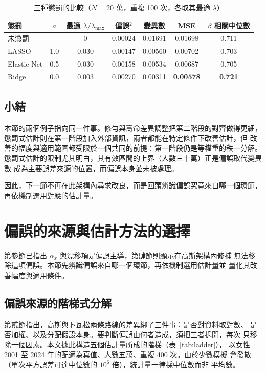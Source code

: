 \documentclass[UTF8, fontset=macnew, a4paper, 12pt]{ctexart}
\begin{document}
\begin{table}[H]
\centering
\caption{三種懲罰的比較（$N=20$ 萬，重複 100 次，各取其最適 $\lambda$）}
\small
\begin{tabular}{lcccccc}
\toprule
懲罰 & $a$ & 最適 $\lambda/\lambda_{\max}$ & 偏誤$^2$ & 變異數 & MSE & $\beta$ 相關中位數\\
\midrule
未懲罰 & --- & 0 & 0.00024 & 0.01691 & 0.01698 & 0.711\\
LASSO & 1.0 & 0.030 & 0.00147 & 0.00560 & 0.00702 & 0.703\\
Elastic Net & 0.5 & 0.030 & 0.00158 & 0.00534 & 0.00687 & 0.705\\
Ridge & 0.0 & 0.003 & 0.00270 & 0.00311 & \textbf{0.00578} & \textbf{0.721}\\
\bottomrule
\end{tabular}
\label{tab:pen}
\end{table}

\subsection{小結}

本節的兩個例子指向同一件事。修勻與壽命差異調整把第二階段的對齊做得更細，
懲罰式估計則在第一階段加入外部資訊，兩者都能在特定條件下改善估計，但
改善的幅度與適用範圍都受限於一個共同的前提：第一階段仍是等權重的秩一分解。
懲罰式估計的限制尤其明白，其有效區間的上界（人數三十萬）正是偏誤取代變異數
成為主要誤差來源的位置，而偏誤本身並未被處理。

因此，下一節不再在此架構內尋求改良，而是回頭辨識偏誤究竟來自哪一個環節，
再依機制選用對應的估計量。

\section{偏誤的來源與估計方法的選擇}

第參節已指出 $\alpha_x$ 與漂移項是偏誤主導，第肆節則顯示在高斯架構內修補
無法移除這項偏誤。本節先辨識偏誤來自哪一個環節，再依機制選用估計量並
量化其改善幅度與適用條件。

\subsection{偏誤來源的階梯式分解}\label{sec:decomp}

第貳節指出，高斯與卜瓦松兩條路線的差異綁了三件事：是否對資料取對數、
是否加權、以及分配假設本身。要判斷偏誤由何者造成，須把三者拆開，每次
只移除一個因素。本文據此構造五個估計量所成的階梯（表~\ref{tab:ladder}），
以女性 2001 至 2024 年的配適為真值、人數五萬、重複 400 次。由於少數模擬
會發散（單次平方誤差可達中位數的 $10^6$ 倍），統計量一律採中位數而非
平均數。
\end{document}
